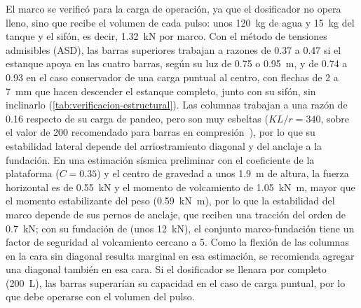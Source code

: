 El marco se verificó para la carga de operación, ya que el dosificador no opera lleno, sino que recibe el volumen de cada pulso: unos \qty{120}{\kilo\gram} de agua y \qty{15}{\kilo\gram} del tanque y el sifón, es decir, \qty{1.32}{\kilo\newton} por marco.
Con el método de tensiones admisibles (ASD), las barras superiores trabajan a razones de \num{0.37} a \num{0.47} si el estanque apoya en las cuatro barras, según su luz de \num{0.75} o \qty{0.95}{\meter}, y de \num{0.74} a \num{0.93} en el caso conservador de una carga puntual al centro, con flechas de 2 a \qty{7}{\milli\meter} que hacen descender el estanque completo, junto con su sifón, sin inclinarlo (\cref{tab:verificacion-estructural}).
Las columnas trabajan a una razón de \num{0.16} respecto de su carga de pandeo, pero son muy esbeltas ($KL/r = 340$, sobre el valor de 200 recomendado para barras en compresión~\parencite{aisc2016specification}), por lo que su estabilidad lateral depende del arriostramiento diagonal y del anclaje a la fundación.
En una estimación sísmica preliminar con el coeficiente de la plataforma ($C = \num{0.35}$) y el centro de gravedad a unos \qty{1.9}{\meter} de altura, la fuerza horizontal es de \qty{0.55}{\kilo\newton} y el momento de volcamiento de \qty{1.05}{\kilo\newton\meter}, mayor que el momento estabilizante del peso (\qty{0.59}{\kilo\newton\meter}), por lo que la estabilidad del marco depende de sus pernos de anclaje, que reciben una tracción del orden de \qty{0.7}{\kilo\newton}; con su fundación de  (unos \qty{12}{\kilo\newton}), el conjunto marco-fundación tiene un factor de seguridad al volcamiento cercano a 5.
Como la flexión de las columnas en la cara sin diagonal resulta marginal en esa estimación, se recomienda agregar una diagonal también en esa cara.
Si el dosificador se llenara por completo (\qty{200}{\liter}), las barras superarían su capacidad en el caso de carga puntual, por lo que debe operarse con el volumen del pulso.

